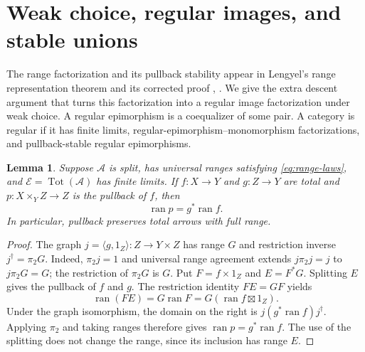 \documentclass[11pt]{article}
\newtheorem{lemma}[theorem]{Lemma}
\theoremstyle{definition}\newtheorem{definition}[theorem]{Definition}
\theoremstyle{remark}\newtheorem{remark}[theorem]{Remark}
\newcommand{\A}{\mathscr A}
\newcommand{\E}{\mathscr E}
\newcommand{\ran}{\operatorname{ran}}
\newcommand{\Tot}{\operatorname{Tot}}
\begin{document}
\section{Weak choice, regular images, and stable unions}\label{sec:regular}

The range factorization and its pullback stability appear in
Lengyel's range representation theorem and its corrected proof
\cite[Theorem~42]{Lengyel}, \cite[Appendix~B]{Repairs}.
We give the extra descent argument that turns this factorization
into a regular image factorization under weak choice.
A regular epimorphism is a coequalizer of some pair. A category is
regular if it has finite limits, regular-epimorphism--monomorphism
factorizations, and pullback-stable regular epimorphisms.

\begin{lemma}\label{lem:pullback-range}
Suppose $\A$ is split, has universal ranges satisfying
\eqref{eq:range-laws}, and $\E=\Tot(\A)$ has finite limits.
If $f:X\to Y$ and $g:Z\to Y$ are total and
$p:X\times_Y Z\to Z$ is the pullback of $f$, then
\[
 \ran p=g^*\ran f.
\]
In particular, pullback preserves total arrows with full range.
\end{lemma}
\begin{proof}
The graph $j=\langle g,1_Z\rangle:Z\to Y\times Z$ has range
$G$ and restriction inverse $j^\dagger=\pi_2G$. Indeed,
$\pi_2j=1$ and universal range agreement extends $j\pi_2j=j$
to $j\pi_2G=G$; the restriction of $\pi_2G$ is $G$.
Put $F=f\times1_Z$ and $E=F^*G$. Splitting $E$ gives the
pullback of $f$ and $g$. The restriction identity $FE=GF$ yields
\[
 \ran(FE)=G\ran F=G(\ran f\boxtimes1_Z).
\]
Under the graph isomorphism, the domain on the right is
$j(g^*\ran f)j^\dagger$. Applying $\pi_2$ and taking ranges
therefore gives $\ran p=g^*\ran f$. The use of the splitting
does not change the range, since its inclusion has range $E$.
\end{proof}
\end{document}
